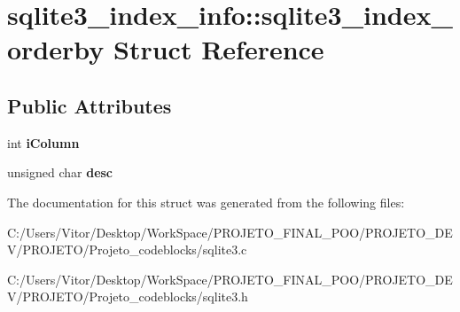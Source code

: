 \hypertarget{structsqlite3__index__info_1_1sqlite3__index__orderby}{\section{sqlite3\-\_\-index\-\_\-info\-:\-:sqlite3\-\_\-index\-\_\-orderby Struct Reference}
\label{structsqlite3__index__info_1_1sqlite3__index__orderby}
}
\subsection*{Public Attributes}
\begin{DoxyCompactItemize}
\item 
\hypertarget{structsqlite3__index__info_1_1sqlite3__index__orderby_a266396085bfda9acef3f13eaa170cd2f}{int {\bfseries i\-Column}}\label{structsqlite3__index__info_1_1sqlite3__index__orderby_a266396085bfda9acef3f13eaa170cd2f}

\item 
\hypertarget{structsqlite3__index__info_1_1sqlite3__index__orderby_a0586d1b5d36221af96aeba8cfc56e9c6}{unsigned char {\bfseries desc}}\label{structsqlite3__index__info_1_1sqlite3__index__orderby_a0586d1b5d36221af96aeba8cfc56e9c6}

\end{DoxyCompactItemize}


The documentation for this struct was generated from the following files\-:\begin{DoxyCompactItemize}
\item 
C\-:/\-Users/\-Vitor/\-Desktop/\-Work\-Space/\-P\-R\-O\-J\-E\-T\-O\-\_\-\-F\-I\-N\-A\-L\-\_\-\-P\-O\-O/\-P\-R\-O\-J\-E\-T\-O\-\_\-\-D\-E\-V/\-P\-R\-O\-J\-E\-T\-O/\-Projeto\-\_\-codeblocks/sqlite3.\-c\item 
C\-:/\-Users/\-Vitor/\-Desktop/\-Work\-Space/\-P\-R\-O\-J\-E\-T\-O\-\_\-\-F\-I\-N\-A\-L\-\_\-\-P\-O\-O/\-P\-R\-O\-J\-E\-T\-O\-\_\-\-D\-E\-V/\-P\-R\-O\-J\-E\-T\-O/\-Projeto\-\_\-codeblocks/sqlite3.\-h\end{DoxyCompactItemize}
